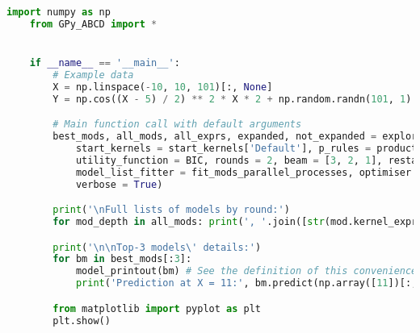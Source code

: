 \begin{lstlisting}[label=lst:GPyABCD_function, language=Python, caption=Main GPy-ABCD \cite{GPy_ABCD} model-space search function with default arguments, breaklines=true, basicstyle=\ttfamily\small]
    import numpy as np
    from GPy_ABCD import *


    if __name__ == '__main__':
        # Example data
        X = np.linspace(-10, 10, 101)[:, None]
        Y = np.cos((X - 5) / 2) ** 2 * X * 2 + np.random.randn(101, 1)

        # Main function call with default arguments
        best_mods, all_mods, all_exprs, expanded, not_expanded = explore_model_space(X, Y,
            start_kernels = start_kernels['Default'], p_rules = production_rules['Default'],
            utility_function = BIC, rounds = 2, beam = [3, 2, 1], restarts = 5,
            model_list_fitter = fit_mods_parallel_processes, optimiser = GPy_optimisers[0],
            verbose = True)

        print('\nFull lists of models by round:')
        for mod_depth in all_mods: print(', '.join([str(mod.kernel_expression) for mod in mod_depth]) + f'\n{len(mod_depth)}')

        print('\n\nTop-3 models\' details:')
        for bm in best_mods[:3]:
            model_printout(bm) # See the definition of this convenience function for examples of model details' extraction
            print('Prediction at X = 11:', bm.predict(np.array([11])[:, None]), '\n')

        from matplotlib import pyplot as plt
        plt.show()
\end{lstlisting}


